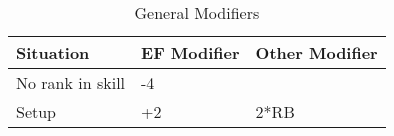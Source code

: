\begin{table}[hb]
\caption{General Modifiers}
\centering
	\begin{tabular}{||l||l|l||} \hline
	Situation			& EF Modifier	& Other Modifier \\ \hline
	No rank in skill 	& -4			& 				 \\
	Setup				& +2			& 2*RB			 \\ \hline
	\end{tabular}
\end{table}
